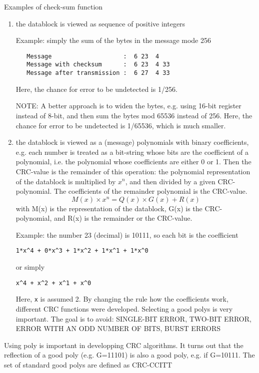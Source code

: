  Examples of check-sum function
\begin{enumerate}
  \item the datablock is viewed as sequence of positive integers
  
Example: simply the sum of the bytes in the message mode 256
  
\begin{verbatim}
   Message                    :  6 23  4
   Message with checksum      :  6 23  4 33
   Message after transmission :  6 27  4 33
\end{verbatim}
Here, the chance for error to be undetected is 1/256.

NOTE: A better approach is to widen the bytes, e.g. using 16-bit register
instead of 8-bit, and then sum the bytes mod 65536 instead of 256. Here, the
chance for error to be undetected is 1/65536, which is much smaller.
 
 
  \item the datablock is viewed as a (message) polynomials with binary
  coefficients, e.g. each number is treated as a bit-string whose bits are the
  coefficient of a polynomial, i.e. the polynomial whose coefficients are either
  0 or 1. Then the CRC-value is the remainder of this operation: the polynomial
  representation of the datablock is multiplied by $x^n$, and then divided
  by a given CRC-polynomial. The coefficients of the remainder polynomial is the
  CRC-value.
\begin{equation}
M(x) \times x^n = Q(x) \times G(x) + R(x)
\end{equation}
with M(x) is the representation of the datablock, G(x) is the CRC-polynomial,
and R(x) is the remainder or the CRC-value.

Example: the number 23 (decimal) is 10111, so each bit is the coefficient
\begin{verbatim}
1*x^4 + 0*x^3 + 1*x^2 + 1*x^1 + 1*x^0
\end{verbatim}
or simply
\begin{verbatim}
x^4 + x^2 + x^1 + x^0
\end{verbatim}
  
  Here, \verb!x! is assumed 2. By changing the rule how the coefficients work,
  different CRC functions were developed. Selecting a good polys is very
  important. The goal is to avoid: SINGLE-BIT ERROR, TWO-BIT ERROR, ERROR WITH
  AN ODD NUMBER OF BITS, BURST ERRORS
 \end{enumerate}


Using poly is important in developping CRC algorithms. It turns out that the
reflection of a good poly (e.g. G=11101) is also a good poly, e.g. if
G=10111. The set of standard good polys are defined as CRC-CCITT

